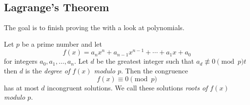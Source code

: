 \documentclass{../ximera}
\begin{document}
\subsection{Lagrange's Theorem}
    The goal is to finish proving the  with a look at polynomials.

    \begin{thm*}\label{thm:lagrange}
        Let $p$ be a prime number and let 
        \[f(x)=a_n x^n +a_{n-1} x^{n-1}+\cdots +a_1 x+a_0\]
        for integers $a_0,a_1,\dots,a_n.$ Let $d$ be the greatest integer such that $a_d\not\equiv 0\pmod{p}t$ then $d$ is the \emph{degree of $f(x)$ modulo $p.$}
        Then the congruence 
        \[f(x)\equiv 0\pmod{p}\]
        has at most $d$ incongruent solutions. We call these solutions \emph{roots of $f(x)$ modulo $p.$}
    \end{thm*}
\end{document}
